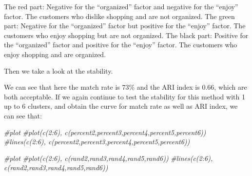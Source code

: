 \documentclass[
  11pt,
]{article}
\newenvironment{Shaded}{\begin{snugshade}}{\end{snugshade}}
\newcommand{\CommentTok}[1]{\textcolor[rgb]{0.56,0.35,0.01}{\textit{#1}}}
\newcommand{\DecValTok}[1]{\textcolor[rgb]{0.00,0.00,0.81}{#1}}
\newcommand{\FunctionTok}[1]{\textcolor[rgb]{0.00,0.00,0.00}{#1}}
\newcommand{\NormalTok}[1]{#1}
\begin{document}
The red part: Negative for the ``organized'' factor and negative for the ``enjoy'' factor. The customers who dislike shopping and are not organized.
The green part: Negative for the ``organized'' factor but positive for the ``enjoy'' factor. The customers who enjoy shopping but are not organized.
The black part: Positive for the ``organized'' factor and positive for the ``enjoy'' factor. The customers who enjoy shopping and are organized.

Then we take a look at the stability.

\begin{Shaded}
\end{Shaded}

We can see that here the match rate is 73\% and the ARI index is 0.66, which are both acceptable. If we again continue to test the stability for this method with 1 up to 6 clusters, and obtain the curve for match rate as well as ARI index, we can see that:

\begin{Shaded}
\begin{Highlighting}[]
\CommentTok{\#plot}
\CommentTok{\#plot(c(2:6), c(percent2,percent3,percent4,percent5,percent6))}
\CommentTok{\#lines(c(2:6), c(percent2,percent3,percent4,percent5,percent6))}

\CommentTok{\#plot}
\CommentTok{\#plot(c(2:6), c(rand2,rand3,rand4,rand5,rand6))}
\CommentTok{\#lines(c(2:6), c(rand2,rand3,rand4,rand5,rand6))}
\end{Highlighting}
\end{Shaded}
\end{document}
